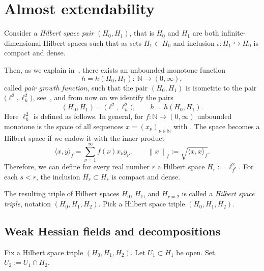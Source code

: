 \documentclass[pdftex]{sigma}
\numberwithin{equation}{section}
\def\Norm#1{\left\|#1\right\|}
\newcommand{\INTO}{\hookrightarrow} %
\newcommand{\1}{{{\mathchoice {\rm 1\mskip-4mu l} {\rm 1\mskip-4mu l}
{\rm 1\mskip-4.5mu l} {\rm 1\mskip-5mu l}}}}
\newcommand{\gf}[1]{#1} %
\begin{document}
\section{Almost extendability}\label{sec:alm-ext}

Consider a \textit{Hilbert space pair} $(H_0,H_1)$,
that is $H_0$ and $H_1$ are both infinite-dimensional Hilbert spaces
such that as sets $H_1\subset H_0$ and inclusion $\iota\colon H_1\INTO H_0$ is
compact and dense.

Then, as we explain in~\cite[Section~2]{Frauenfelder:2024c},
there exists an unbounded monotone function
\[
 \gf{h}=\gf{h}(H_0,H_1) \colon\ \mathbb{N} \to (0,\infty),
\]
called \textit{pair growth function}, such that the pair $(H_0,H_1)$
is isometric to the pair $\bigl(\ell^2,\ell^2_{\gf{h}}\bigr)$,
see~\cite[Appendix~A]{Frauenfelder:2024c}, and from now on we identify
the pairs
\[
 (H_0,H_1)=\bigl(\ell^2, \ell^2_\gf{h}\bigr)
 ,\qquad
 \gf{h}=\gf{h}(H_0,H_1) .
\]
Here $\ell^2_\gf{h}$ is defined as follows. In general,
for $\gf{f}\colon\mathbb{N}\to(0,\infty)$ unbounded monotone
\smash{$\ell^2_\gf{f}$} is the space of all sequences $x=(x_\nu)_{\nu \in \mathbb{N}}$ with
\smash{$\sum_{\nu=1}^\infty \gf{f}(\nu)x_\nu^2 <\infty$}.
%
The space \smash{$\ell^2_\gf{f}$} becomes a Hilbert space if we endow it
with the inner product
\begin{equation*}%
 \langle x,y \rangle_\gf{f}=\sum_{\nu=1}^\infty \gf{f}(\nu)x_\nu y_\nu
 ,\qquad
 \Norm{x}_\gf{f}:=\sqrt{\langle x,x \rangle_\gf{f}} .
\end{equation*}
Therefore, we can define for every real number $r$ a Hilbert space
$ H_r:=\ell^2_{\gf{f}^r}$.
For each $s<r$, the inclusion $H_r\subset H_s$
is compact and dense.

The resulting triple of Hilbert spaces $H_0$, $H_1$, and $H_{r=2}$
is called a \textit{Hilbert space triple}, notation $(H_0,H_1,H_2)$.
Pick a Hilbert space triple $(H_0,H_1,H_2)$.

\subsection{Weak Hessian fields and decompositions}

Fix a Hilbert space triple $(H_0,H_1,H_2)$.
Let $U_1\subset H_1$ be open. Set $U_2:=U_1\cap H_2$.
\end{document}
